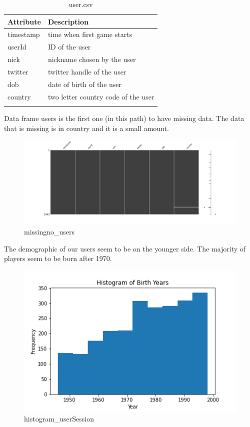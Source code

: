 \begin{center}
\begin{longtable}{ |l|l| } 
 \hline
 Attribute & Description\\ 
 \hline
 timestamp & time when first game starts\\ 
 \hline
 userId & ID of the user\\ 
 \hline
 nick & nickname chosen by the user\\ 
 \hline
 twitter & twitter handle of the user\\ 
 \hline
 dob & date of birth of the user\\ 
 \hline
 country & two letter country code of the user\\ 
 \hline
\caption{user.csv}
\end{longtable}
\end{center}

Data frame users is the first one (in this path) to have missing data. The data that is missing is in country and it is a small amount.
\begin{figure}[H]
\includegraphics[scale=0.25]{img/Graphs/users/missingno_user.png}
\centering
\caption{missingno\_users}
\label{fig:missingno_user}
\end{figure}

The demographic of our users seem to be on the younger side. The majority of players seem to be born after 1970.
\begin{figure}[H]
\includegraphics[scale=0.85]{img/Graphs/users/histogram_users.png}
\centering
\caption{histogram\_userSession}
\label{fig:histogram_users}
\end{figure}

